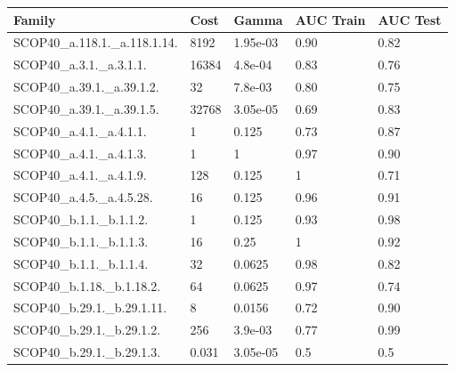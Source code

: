 \documentclass[11pt]{article}
\begin{document}
\begin{longtable}{|p{}|p{}|p{}|p{}|p{}|}
	\hline
	\textbf{Family}               & \textbf{Cost} & \textbf{Gamma}   & \textbf{AUC Train} & \textbf{AUC Test} \\ \hline
	SCOP40\_a.118.1.\_a.118.1.14. & 8192  & 1.95e-03  & 0.90  & 0.82  \\ \hline
	
	SCOP40\_a.3.1.\_a.3.1.1.      & 16384 & 4.8e-04   & 0.83  & 0.76  \\ \hline
	
	SCOP40\_a.39.1.\_a.39.1.2.    & 32    & 7.8e-03   & 0.80  & 0.75  \\ \hline
	
	SCOP40\_a.39.1.\_a.39.1.5.    & 32768 & 3.05e-05  & 0.69  & 0.83  \\ \hline
	
	SCOP40\_a.4.1.\_a.4.1.1.      & 1     & 0.125     & 0.73  & 0.87  \\ \hline
	
	SCOP40\_a.4.1.\_a.4.1.3.      & 1     & 1         & 0.97  & 0.90  \\ \hline
	
	SCOP40\_a.4.1.\_a.4.1.9.      & 128   & 0.125     & 1     & 0.71  \\ \hline
	
	SCOP40\_a.4.5.\_a.4.5.28.     & 16    & 0.125     & 0.96  & 0.91  \\ \hline
	
	SCOP40\_b.1.1.\_b.1.1.2.      & 1     & 0.125     & 0.93  & 0.98  \\ \hline
	
	SCOP40\_b.1.1.\_b.1.1.3.      & 16    & 0.25      & 1     & 0.92  \\ \hline
	
	SCOP40\_b.1.1.\_b.1.1.4.      & 32    & 0.0625    & 0.98  & 0.82  \\ \hline
	
	SCOP40\_b.1.18.\_b.1.18.2.    & 64    & 0.0625    & 0.97  & 0.74  \\ \hline
	
	SCOP40\_b.29.1.\_b.29.1.11.   & 8     & 0.0156    & 0.72  & 0.90  \\ \hline
	
	SCOP40\_b.29.1.\_b.29.1.2.    & 256   & 3.9e-03   & 0.77  & 0.99  \\ \hline
	
	SCOP40\_b.29.1.\_b.29.1.3.    & 0.031 & 3.05e-05 & 0.5    & 0.5   \\ \hline
	

\end{longtable}
\end{document}
